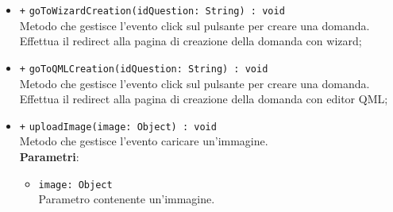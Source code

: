 \begin{itemize}
\begin{itemize}
		\item \texttt{+} \texttt{goToWizardCreation(idQuestion: String) : void} \\ 
		Metodo che gestisce l'evento click sul pulsante per creare una domanda. Effettua il redirect alla pagina di creazione della domanda con wizard; \\
		\item \texttt{+} \texttt{goToQMLCreation(idQuestion: String) : void} \\ 
		Metodo che gestisce l'evento click sul pulsante per creare una domanda. Effettua il redirect alla pagina di creazione della domanda con editor QML;\\
		\item \texttt{+} \texttt{uploadImage(image: Object) : void} \\ 
		Metodo che gestisce l'evento caricare un'immagine. \\
		\textbf{Parametri}:
		\begin{itemize}
			\item \texttt{image: Object} \\
			Parametro contenente un'immagine.
		\end{itemize}
	\end{itemize}
\end{itemize}	

